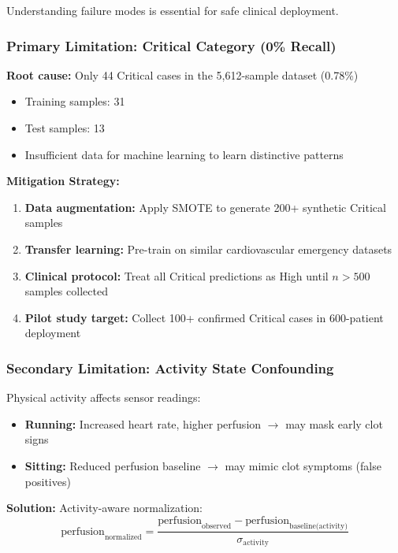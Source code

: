 \documentclass[3p,times,procedia]{elsarticle}
\begin{document}
Understanding failure modes is essential for safe clinical deployment.

\subsubsection{Primary Limitation: \textbf{Critical Category (0\% Recall)}}

\textbf{Root cause:} Only 44 Critical cases in the 5,612-sample dataset (0.78\%)
\begin{itemize}
    \item Training samples: 31
    \item Test samples: 13
    \item Insufficient data for machine learning to learn distinctive patterns
\end{itemize}

\textbf{Mitigation Strategy:}
\begin{enumerate}
    \item \textbf{Data augmentation:} Apply SMOTE to generate 200+ synthetic Critical samples
    \item \textbf{Transfer learning:} Pre-train on similar cardiovascular emergency datasets
    \item \textbf{Clinical protocol:} Treat all Critical predictions as High until $n>500$ samples collected
    \item \textbf{Pilot study target:} Collect 100+ confirmed Critical cases in 600-patient deployment
\end{enumerate}

\subsubsection{Secondary Limitation: \textbf{Activity State Confounding}}

Physical activity affects sensor readings:
\begin{itemize}
    \item \textbf{Running:} Increased heart rate, higher perfusion $\rightarrow$ may mask early clot signs
    \item \textbf{Sitting:} Reduced perfusion baseline $\rightarrow$ may mimic clot symptoms (false positives)
\end{itemize}

\textbf{Solution:} Activity-aware normalization:
\[
\text{perfusion}_{\text{normalized}} =
\frac{\text{perfusion}_{\text{observed}} - \text{perfusion}_{\text{baseline(activity)}}}{\sigma_{\text{activity}}}
\]
\end{document}
